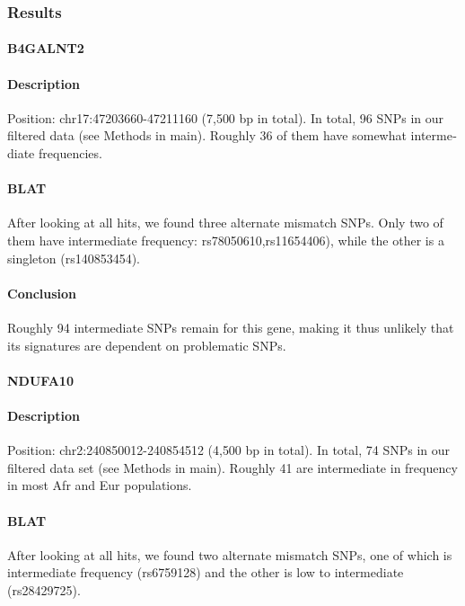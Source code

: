 \begin{refsection}
\begin{otherlanguage}{english}
\begin{footnotesize}
\subsubsection{Results}

\paragraph{B4GALNT2}

\paragraph{Description} Position: chr17:47203660-47211160 (7,500 bp in total).
In total, 96 SNPs in our filtered data (see Methods in main). Roughly 36 of them have somewhat intermediate frequencies.

\paragraph{BLAT} After looking at all hits, we found three alternate mismatch SNPs. Only two of them have intermediate frequency: rs78050610,rs11654406), while the other is a singleton (rs140853454).

\paragraph{Conclusion} Roughly 94 intermediate SNPs remain for this gene, making it thus unlikely that its signatures are dependent on problematic SNPs.

\medskip
\paragraph{NDUFA10}

\paragraph{Description} Position: chr2:240850012-240854512 (4,500 bp in total). 
In total, 74 SNPs in our filtered data set (see Methods in main). Roughly 41 are intermediate in frequency in most Afr and Eur populations.

\paragraph{BLAT} After looking at all hits, we found two alternate mismatch SNPs, one of which is intermediate frequency (rs6759128) and the other is low to intermediate (rs28429725). 


\end{footnotesize}
\end{otherlanguage}
\end{refsection}
